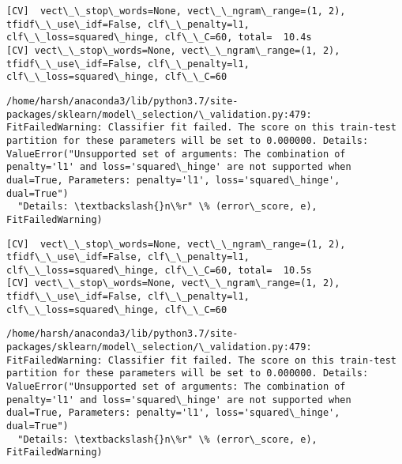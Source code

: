 \documentclass[11pt]{article}
\begin{document}
    \begin{Verbatim}[commandchars=\\\{\}]
[CV]  vect\_\_stop\_words=None, vect\_\_ngram\_range=(1, 2), tfidf\_\_use\_idf=False, clf\_\_penalty=l1, clf\_\_loss=squared\_hinge, clf\_\_C=60, total=  10.4s
[CV] vect\_\_stop\_words=None, vect\_\_ngram\_range=(1, 2), tfidf\_\_use\_idf=False, clf\_\_penalty=l1, clf\_\_loss=squared\_hinge, clf\_\_C=60 

    \end{Verbatim}

    \begin{Verbatim}[commandchars=\\\{\}]
/home/harsh/anaconda3/lib/python3.7/site-packages/sklearn/model\_selection/\_validation.py:479: FitFailedWarning: Classifier fit failed. The score on this train-test partition for these parameters will be set to 0.000000. Details: 
ValueError("Unsupported set of arguments: The combination of penalty='l1' and loss='squared\_hinge' are not supported when dual=True, Parameters: penalty='l1', loss='squared\_hinge', dual=True")
  "Details: \textbackslash{}n\%r" \% (error\_score, e), FitFailedWarning)

    \end{Verbatim}

    \begin{Verbatim}[commandchars=\\\{\}]
[CV]  vect\_\_stop\_words=None, vect\_\_ngram\_range=(1, 2), tfidf\_\_use\_idf=False, clf\_\_penalty=l1, clf\_\_loss=squared\_hinge, clf\_\_C=60, total=  10.5s
[CV] vect\_\_stop\_words=None, vect\_\_ngram\_range=(1, 2), tfidf\_\_use\_idf=False, clf\_\_penalty=l1, clf\_\_loss=squared\_hinge, clf\_\_C=60 

    \end{Verbatim}

    \begin{Verbatim}[commandchars=\\\{\}]
/home/harsh/anaconda3/lib/python3.7/site-packages/sklearn/model\_selection/\_validation.py:479: FitFailedWarning: Classifier fit failed. The score on this train-test partition for these parameters will be set to 0.000000. Details: 
ValueError("Unsupported set of arguments: The combination of penalty='l1' and loss='squared\_hinge' are not supported when dual=True, Parameters: penalty='l1', loss='squared\_hinge', dual=True")
  "Details: \textbackslash{}n\%r" \% (error\_score, e), FitFailedWarning)

    \end{Verbatim}
\end{document}
